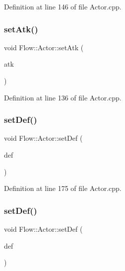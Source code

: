 Definition at line 146 of file Actor.\+cpp.

\hypertarget{class_flow_1_1_actor_a2f9aa41cb7a5e4a4319d26df739e6cbc}{}\label{class_flow_1_1_actor_a2f9aa41cb7a5e4a4319d26df739e6cbc} 
\subsubsection{\texorpdfstring{set\+Atk()}{setAtk()}\hspace{0.1cm}{\footnotesize\ttfamily [2/2]}}
{\footnotesize\ttfamily void Flow\+::\+Actor\+::set\+Atk (\begin{DoxyParamCaption}\item[{const \hyperlink{class_flow_1_1_b_stat}{B\+Stat} \&}]{atk }\end{DoxyParamCaption})}



Definition at line 136 of file Actor.\+cpp.

\hypertarget{class_flow_1_1_actor_ac16d68ce3b4ae9c101e88c88c5a8fba7}{}\label{class_flow_1_1_actor_ac16d68ce3b4ae9c101e88c88c5a8fba7} 
\subsubsection{\texorpdfstring{set\+Def()}{setDef()}\hspace{0.1cm}{\footnotesize\ttfamily [1/2]}}
{\footnotesize\ttfamily void Flow\+::\+Actor\+::set\+Def (\begin{DoxyParamCaption}\item[{unsigned char}]{def }\end{DoxyParamCaption})}



Definition at line 175 of file Actor.\+cpp.

\hypertarget{class_flow_1_1_actor_a7f26d278d238642dc41a078a1bf11e17}{}\label{class_flow_1_1_actor_a7f26d278d238642dc41a078a1bf11e17} 
\subsubsection{\texorpdfstring{set\+Def()}{setDef()}\hspace{0.1cm}{\footnotesize\ttfamily [2/2]}}
{\footnotesize\ttfamily void Flow\+::\+Actor\+::set\+Def (\begin{DoxyParamCaption}\item[{const \hyperlink{class_flow_1_1_b_stat}{B\+Stat} \&}]{def }\end{DoxyParamCaption})}



